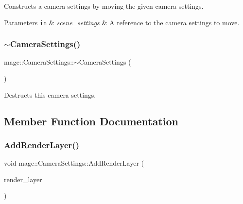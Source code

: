 Constructs a camera settings by moving the given camera settings.


\begin{DoxyParams}[1]{Parameters}
\mbox{\tt in}  & {\em scene\+\_\+settings} & A reference to the camera settings to move. \\
\hline
\end{DoxyParams}
\hypertarget{classmage_1_1_camera_settings_a738a93dc2e1aed2cac7a58af658984f3}{}\label{classmage_1_1_camera_settings_a738a93dc2e1aed2cac7a58af658984f3} 
\subsubsection{\texorpdfstring{$\sim$\+Camera\+Settings()}{~CameraSettings()}}
{\footnotesize\ttfamily mage\+::\+Camera\+Settings\+::$\sim$\+Camera\+Settings (\begin{DoxyParamCaption}{ }\end{DoxyParamCaption})\hspace{0.3cm}{\ttfamily [default]}}

Destructs this camera settings. 

\subsection{Member Function Documentation}
\hypertarget{classmage_1_1_camera_settings_ab1dca8b8f52daf55614592e0bb640ae9}{}\label{classmage_1_1_camera_settings_ab1dca8b8f52daf55614592e0bb640ae9} 
\subsubsection{\texorpdfstring{Add\+Render\+Layer()}{AddRenderLayer()}}
{\footnotesize\ttfamily void mage\+::\+Camera\+Settings\+::\+Add\+Render\+Layer (\begin{DoxyParamCaption}\item[{\hyperlink{namespacemage_a8b4a82582105b0299e2c2be5af7255d6}{Render\+Layer}}]{render\+\_\+layer }\end{DoxyParamCaption})\hspace{0.3cm}{\ttfamily [noexcept]}}

